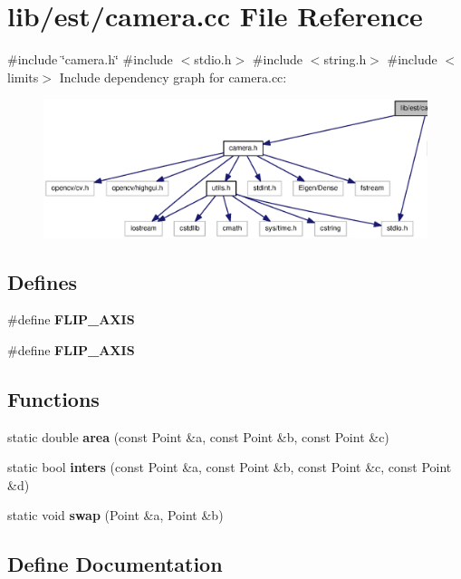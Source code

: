 \section{lib/est/camera.cc \-File \-Reference}
\label{camera_8cc}
{\ttfamily \#include \char`\"{}camera.\-h\char`\"{}}\*
{\ttfamily \#include $<$stdio.\-h$>$}\*
{\ttfamily \#include $<$string.\-h$>$}\*
{\ttfamily \#include $<$limits$>$}\*
\-Include dependency graph for camera.\-cc\-:\nopagebreak
\begin{figure}[H]
\begin{center}
\leavevmode
\includegraphics[width=350pt]{camera_8cc__incl}
\end{center}
\end{figure}
\subsection*{\-Defines}
\begin{DoxyCompactItemize}
\item 
\#define {\bf \-F\-L\-I\-P\-\_\-\-A\-X\-I\-S}
\item 
\#define {\bf \-F\-L\-I\-P\-\_\-\-A\-X\-I\-S}
\end{DoxyCompactItemize}
\subsection*{\-Functions}
\begin{DoxyCompactItemize}
\item 
static double {\bf area} (const \-Point \&a, const \-Point \&b, const \-Point \&c)
\item 
static bool {\bf inters} (const \-Point \&a, const \-Point \&b, const \-Point \&c, const \-Point \&d)
\item 
static void {\bf swap} (\-Point \&a, \-Point \&b)
\end{DoxyCompactItemize}


\subsection{\-Define \-Documentation}
